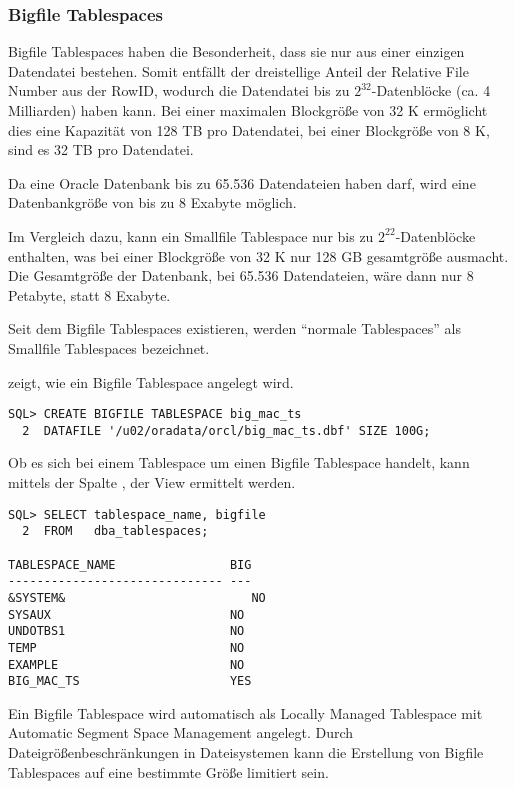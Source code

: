         \subsubsection{Bigfile Tablespaces}
          Bigfile Tablespaces haben die Besonderheit, dass sie nur aus einer einzigen Datendatei bestehen. Somit entfällt der dreistellige Anteil der Relative File Number aus der RowID, wodurch die Datendatei bis zu $2^{32}$-Datenblöcke (ca. 4 Milliarden) haben kann. Bei einer maximalen Blockgröße von 32 K ermöglicht dies eine Kapazität von 128 TB pro Datendatei, bei einer Blockgröße von 8 K, sind es 32 TB pro Datendatei.

          Da eine Oracle Datenbank bis zu 65.536 Datendateien haben darf, wird eine Datenbankgröße von bis zu 8 Exabyte möglich.

          Im Vergleich dazu, kann ein Smallfile Tablespace nur bis zu $2^{22}$-Datenblöcke enthalten, was bei einer Blockgröße von 32 K nur 128 GB gesamtgröße ausmacht. Die Gesamtgröße der Datenbank, bei 65.536 Datendateien, wäre dann nur 8 Petabyte, statt 8 Exabyte.
          \begin{merke}
            Seit dem Bigfile Tablespaces existieren, werden \enquote{normale Tablespaces} als Smallfile Tablespaces bezeichnet.
          \end{merke}
          \begin{literaturinternet}
            \item \cite{REFRN0042}
            \item \cite{doctbtthtm}
          \end{literaturinternet}

           zeigt, wie ein Bigfile Tablespace angelegt wird.
          \begin{lstlisting}[caption={Einen Bigfile Tablespace anlegen},label=admin107,language=oracle_sql]
SQL> CREATE BIGFILE TABLESPACE big_mac_ts
  2  DATAFILE '/u02/oradata/orcl/big_mac_ts.dbf' SIZE 100G;
          \end{lstlisting}
          Ob es sich bei einem Tablespace um einen Bigfile Tablespace handelt, kann mittels der Spalte , der View  ermittelt werden.
          \begin{lstlisting}[caption={Die View \identifier{dba\_tablespaces}},label=admin108,language=oracle_sql]
SQL> SELECT tablespace_name, bigfile
  2  FROM   dba_tablespaces;

TABLESPACE_NAME                BIG
------------------------------ ---
&SYSTEM&                          NO
SYSAUX                         NO
UNDOTBS1                       NO
TEMP                           NO
EXAMPLE                        NO
BIG_MAC_TS                     YES
          \end{lstlisting}
          \begin{merke}
            Ein Bigfile Tablespace wird automatisch als Locally Managed Tablespace mit Automatic Segment Space Management angelegt. Durch Dateigrößenbeschränkungen in Dateisystemen kann die Erstellung von Bigfile Tablespaces auf eine bestimmte Größe limitiert sein.
          \end{merke}
